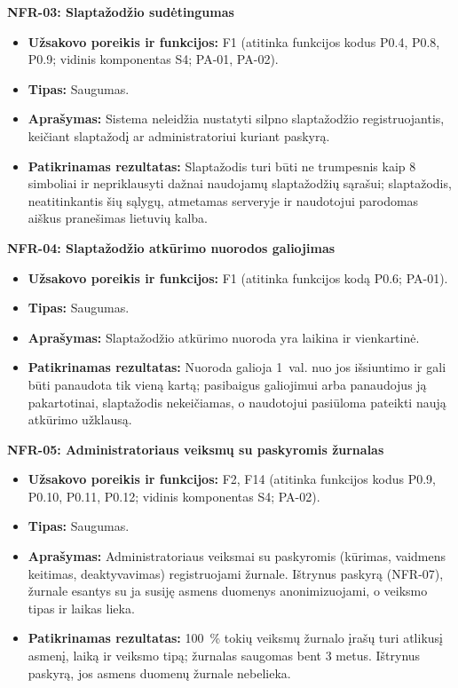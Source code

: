 \noindent\textbf{NFR-03: Slaptažodžio sudėtingumas}
\begin{itemize}
    \item \textbf{Užsakovo poreikis ir funkcijos:} F1 (atitinka funkcijos kodus P0.4, P0.8, P0.9; vidinis komponentas S4; PA-01, PA-02).
    \item \textbf{Tipas:} Saugumas.
    \item \textbf{Aprašymas:} Sistema neleidžia nustatyti silpno slaptažodžio registruojantis, keičiant slaptažodį ar administratoriui kuriant paskyrą.
    \item \textbf{Patikrinamas rezultatas:} Slaptažodis turi būti ne trumpesnis kaip 8 simboliai ir nepriklausyti dažnai naudojamų slaptažodžių sąrašui; slaptažodis, neatitinkantis šių sąlygų, atmetamas serveryje ir naudotojui parodomas aiškus pranešimas lietuvių kalba.
\end{itemize}

\noindent\textbf{NFR-04: Slaptažodžio atkūrimo nuorodos galiojimas}
\begin{itemize}
    \item \textbf{Užsakovo poreikis ir funkcijos:} F1 (atitinka funkcijos kodą P0.6; PA-01).
    \item \textbf{Tipas:} Saugumas.
    \item \textbf{Aprašymas:} Slaptažodžio atkūrimo nuoroda yra laikina ir vienkartinė.
    \item \textbf{Patikrinamas rezultatas:} Nuoroda galioja 1~val. nuo jos išsiuntimo ir gali būti panaudota tik vieną kartą; pasibaigus galiojimui arba panaudojus ją pakartotinai, slaptažodis nekeičiamas, o naudotojui pasiūloma pateikti naują atkūrimo užklausą.
\end{itemize}

\noindent\textbf{NFR-05: Administratoriaus veiksmų su paskyromis žurnalas}
\begin{itemize}
    \item \textbf{Užsakovo poreikis ir funkcijos:} F2, F14 (atitinka funkcijos kodus P0.9, P0.10, P0.11, P0.12; vidinis komponentas S4; PA-02).
    \item \textbf{Tipas:} Saugumas.
    \item \textbf{Aprašymas:} Administratoriaus veiksmai su paskyromis (kūrimas, vaidmens keitimas, deaktyvavimas) registruojami žurnale. Ištrynus paskyrą (NFR-07), žurnale esantys su ja susiję asmens duomenys anonimizuojami, o veiksmo tipas ir laikas lieka.
    \item \textbf{Patikrinamas rezultatas:} 100~\% tokių veiksmų žurnalo įrašų turi atlikusį asmenį, laiką ir veiksmo tipą; žurnalas saugomas bent 3 metus. Ištrynus paskyrą, jos asmens duomenų žurnale nebelieka.
\end{itemize}


